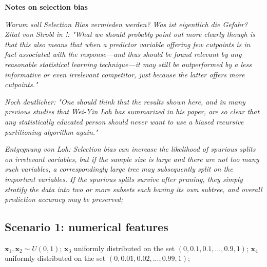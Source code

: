 \textbf{Notes on selection bias}

\textit{Warum soll Selection Bias vermieden werden? Was ist eigentlich die Gefahr? 
Zitat von Strobl in \citep{Loh.2014}!: "What we should probably point out more clearly though is that this also means that when
a predictor variable offering few cutpoints is in fact associated with the response—and thus
should be found relevant by any reasonable statistical learning technique—it may still be outperformed by a less informative or even irrelevant competitor, just because the latter offers more cutpoints."}

\textit{Noch deutlicher: "One should think that the results shown here, and in many previous studies that Wei-Yin Loh has summarized in his paper, are so clear that any statistically educated person should never
want to use a biased recursive partitioning algorithm again."}

\textit{Entgegnung von Loh: Selection bias can increase the likelihood of spurious splits on irrelevant variables,
but if the sample size is large and there are not too many such variables, a correspondingly
large tree may subsequently split on the important variables. If the spurious splits survive after
pruning, they simply stratify the data into two or more subsets each having its own subtree, and
overall prediction accuracy may be preserved;}






\vspace{1cm}




\subsection{Scenario 1: numerical features}
$\textbf{x}_{1}, \textbf{x}_{2} \sim U(0,1)$; 
$\textbf{x}_{3}$ uniformly distributed on the set $(0, 0.1, 0.1,..., 0.9, 1)$;
$\textbf{x}_{4}$ uniformly distributed on the set $(0, 0.01, 0.02,..., 0.99, 1)$;
   
